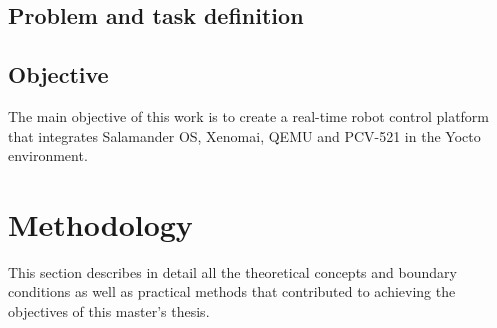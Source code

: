 \documentclass[MMR,Master,english]{twbook}
\begin{document}
\section{Problem and task definition}
\clearpage
\section{Objective}

The main objective of this work is to create a real-time robot control platform that integrates Salamander OS, Xenomai, QEMU and PCV-521 in the Yocto environment.


\clearpage

\chapter{Methodology}\label{cha:methodology}

This section describes in detail all the theoretical concepts and boundary conditions as well as practical methods that contributed to achieving the objectives of this master's thesis.
\end{document}
